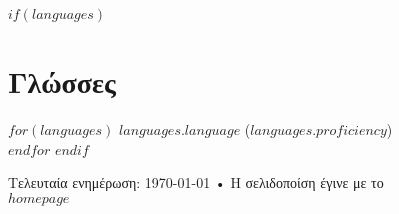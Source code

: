 \documentclass[$fontsize$, a4paper]{article}
\begin{document}
$if(languages)$
\section{Γλώσσες}
$for(languages)$
\emph{$languages.language$} ($languages.proficiency$)\\
$endfor$
$endif$

\vfill{}

\begin{center}
{\scriptsize  Τελευταία ενημέρωση: \today\- •\-
Η σελιδοποίση έγινε με το \href{https://github.com/mrzool/cv-boilerplate}{
\XeTeX }\\
\href{http://$homepage$}{$homepage$}}
\end{center}
\end{document}
